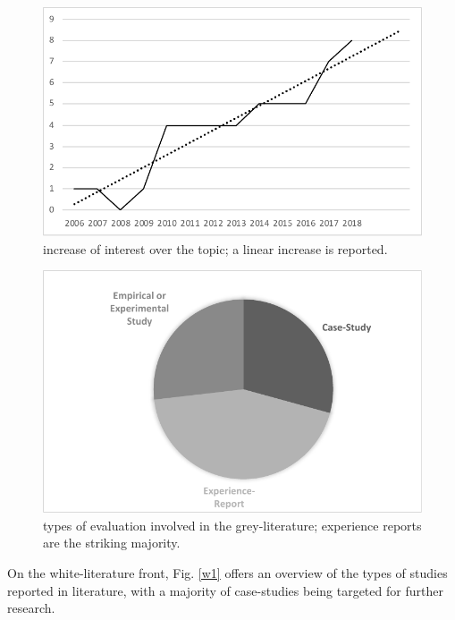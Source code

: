\begin{figure}
\begin{center}
\includegraphics[scale=0.7]{./img/gtimeline.pdf}
\end{center}
\caption{increase of interest over the topic; a linear increase is reported.}\label{g2}
\end{figure}

\begin{figure}
\begin{center}
\includegraphics[scale=0.75]{./img/gtypeeval.pdf}
\end{center}
\caption{types of evaluation involved in the grey-literature; experience reports are the striking majority.}\label{g3}
\end{figure}

On the white-literature front, Fig. \ref{w1} offers an overview of the types of studies reported in literature, with a majority of case-studies being targeted for further research.

